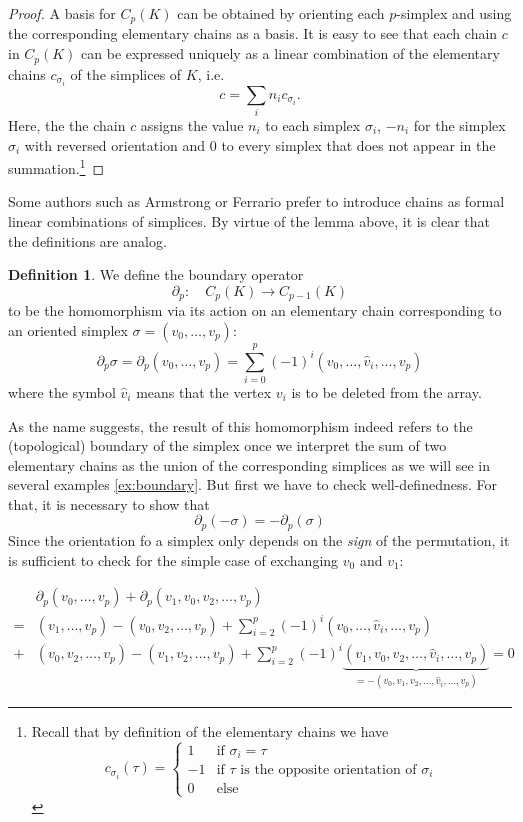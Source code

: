 \documentclass[toc=bib, headinclude]{scrartcl}
\theoremstyle{plain}
\theoremstyle{definition}
\newtheorem	{definition}[theorem]{Definition}
\theoremstyle{remark}
\begin{document}
\begin{proof}
	A basis for $C_p(K)$ can be obtained by orienting each $p$-simplex and using the corresponding elementary chains as a basis.
	It is easy to see that each chain $c$ in $C_p(K)$ can be expressed uniquely as a linear combination of the elementary chains $c_{\sigma_i}$ of the simplices of $K$, i.e.
	\[
	c=\sum_{i}n_i c_{\sigma_i}.
	\]
	Here, the the chain $c$ assigns the value $n_i$ to each simplex $\sigma_i$, $-n_i$ for the simplex $\sigma_i$ with reversed orientation and $0$ to every simplex that does not appear in the summation.\footnote{Recall that by definition of the elementary chains we have \[c_{\sigma_i}(\tau)=\begin{cases}
		1 &\text{if }\sigma_i=\tau\\
		-1&\text{if }\tau \text{ is the opposite orientation of }\sigma_i\\
		0&\text{else}
		\end{cases}
		\]}
\end{proof}

Some authors such as Armstrong \parencite[p.176f]{ar} or Ferrario \parencite[p.60]{fe} prefer to introduce chains as formal linear combinations of simplices. By virtue of the lemma above, it is clear that the definitions are analog.

\begin{definition}
	We define the boundary operator 
	\[
	\partial_p:\quad C_p(K)\to C_{p-1}(K)
	\]
	to be the homomorphism via its action on an elementary chain corresponding to an oriented simplex $\sigma=(v_0,\dots,v_p)$:
	\[
	\partial_p\sigma=\partial_p(v_0,\dots,v_p)=\sum_{i=0}^{p}(-1)^i(v_0,\dots,\hat{v}_i,\dots,v_p)
	\]
	where the symbol $\hat{v}_i$ means that the vertex $v_i$ is to be deleted from the array.
\end{definition}

As the name suggests, the result of this homomorphism indeed refers to the (topological) boundary of the simplex once we interpret the sum of two elementary chains as the union of the corresponding simplices as we will see in several examples \ref{ex:boundary}. But first we have to check well-definedness. For that, it is necessary to show that
\[\partial_p(-\sigma)=-\partial_p(\sigma) 
\]
Since the orientation fo a simplex only depends on the \emph{sign} of the permutation, it is sufficient to check for the simple case of exchanging $v_0$ and $v_1$:

\begin{align*}
	&\partial_p(v_0,\dots,v_p)+\partial_p(v_1,v_0,v_2,\dots,v_p)\\
	=&(v_1,\dots,v_p)-(v_0,v_2,\dots,v_p)+\sum_{i=2}^{p}(-1)^i(v_0,\dots,\hat{v}_i,\dots,v_p)\\
	+&(v_0,v_2,\dots,v_p)-(v_1,v_2,\dots,v_p)+\sum_{i=2}^p(-1)^i\underset{=-(v_0,v_1,v_2,\dots,\hat{v}_i,\dots,v_p)}{\underbrace{\ensuremath{(v_1,v_0,v_2,\dots,\hat{v}_i,\dots,v_p)}}}=0
\end{align*}
\end{document}
